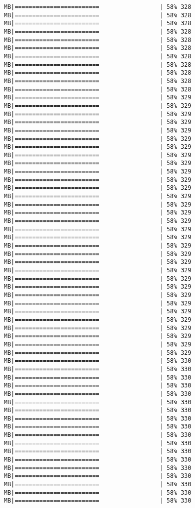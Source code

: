 \documentclass[
]{article}
\begin{document}
\begin{verbatim}
MB|========================                 | 58% 328 MB|========================                 | 58% 328 MB|========================                 | 58% 328 MB|========================                 | 58% 328 MB|========================                 | 58% 328 MB|========================                 | 58% 328 MB|========================                 | 58% 328 MB|========================                 | 58% 328 MB|========================                 | 58% 328 MB|========================                 | 58% 328 MB|========================                 | 58% 328 MB|========================                 | 58% 329 MB|========================                 | 58% 329 MB|========================                 | 58% 329 MB|========================                 | 58% 329 MB|========================                 | 58% 329 MB|========================                 | 58% 329 MB|========================                 | 58% 329 MB|========================                 | 58% 329 MB|========================                 | 58% 329 MB|========================                 | 58% 329 MB|========================                 | 58% 329 MB|========================                 | 58% 329 MB|========================                 | 58% 329 MB|========================                 | 58% 329 MB|========================                 | 58% 329 MB|========================                 | 58% 329 MB|========================                 | 58% 329 MB|========================                 | 58% 329 MB|========================                 | 58% 329 MB|========================                 | 58% 329 MB|========================                 | 58% 329 MB|========================                 | 58% 329 MB|========================                 | 58% 329 MB|========================                 | 58% 329 MB|========================                 | 58% 329 MB|========================                 | 58% 329 MB|========================                 | 58% 329 MB|========================                 | 58% 329 MB|========================                 | 58% 329 MB|========================                 | 58% 329 MB|========================                 | 58% 329 MB|========================                 | 58% 329 MB|========================                 | 58% 330 MB|========================                 | 58% 330 MB|========================                 | 58% 330 MB|========================                 | 58% 330 MB|========================                 | 58% 330 MB|========================                 | 58% 330 MB|========================                 | 58% 330 MB|========================                 | 58% 330 MB|========================                 | 58% 330 MB|========================                 | 58% 330 MB|========================                 | 58% 330 MB|========================                 | 58% 330 MB|========================                 | 58% 330 MB|========================                 | 58% 330 MB|========================                 | 58% 330 MB|========================                 | 58% 330 MB|========================                 | 58% 330 MB|========================                 | 58% 330 
\end{verbatim}
\end{document}
